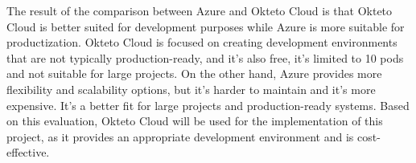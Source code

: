 The result of the comparison between Azure and Okteto Cloud is that Okteto Cloud is better suited for development purposes while Azure is more suitable for productization. Okteto Cloud is focused on creating development environments that are not typically production-ready, and it's also free, it's limited to 10 pods and not suitable for large projects. On the other hand, Azure provides more flexibility and scalability options, but it's harder to maintain and it's more expensive. It's a better fit for large projects and production-ready systems. Based on this evaluation, Okteto Cloud will be used for the implementation of this project, as it provides an appropriate development environment and is cost-effective.